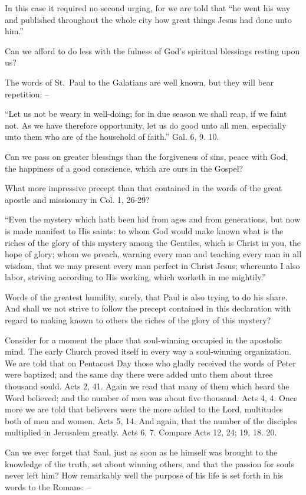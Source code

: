 \documentclass[
]{book}
\begin{document}
In this case it required no second urging, for we are told that ``he went his way and published throughout the whole city how great things Jesus had done unto him.''

Can we afford to do less with the fulness of God's spiritual blessings resting upon us?

The words of St.~Paul to the Galatians are well known, but they will bear repetition: --

``Let us not be weary in well-doing; for in due season we shall reap, if we faint not. As we have therefore opportunity, let us do good unto all men, especially unto them who are of the household of faith.'' Gal. 6, 9. 10.

Can we pass on greater blessings than the forgiveness of sins, peace with God, the happiness of a good conscience, which are ours in the Gospel?

What more impressive precept than that contained in the words of the great apostle and missionary in Col. 1, 26-29?

``Even the mystery which hath been hid from ages and from generations, but now is made manifest to His saints: to whom God would make known what is the riches of the glory of this mystery among the Gentiles, which is Christ in you, the hope of glory; whom we preach, warning every man and teaching every man in all wisdom, that we may present every man perfect in Christ Jesus; whereunto I also labor, striving according to His working, which worketh in me mightily.''

Words of the greatest humility, surely, that Paul is also trying to do his share. And shall we not strive to follow the precept contained in this declaration with regard to making known to others the riches of the glory of this mystery?

Consider for a moment the place that soul-winning occupied in the apostolic mind. The early Church proved itself in every way a soul-winning organization. We are told that on Pentacost Day those who gladly received the words of Peter were baptized; and the same day there were added unto them about three thousand sould. Acts 2, 41. Again we read that many of them which heard the Word believed; and the number of men was about five thousand. Acts 4, 4. Once more we are told that believers were the more added to the Lord, multitudes both of men and women. Acts 5, 14. And again, that the number of the disciples multiplied in Jerusalem greatly. Acts 6, 7. Compare Acts 12, 24; 19, 18. 20.

Can we ever forget that Saul, just as soon as he himself was brought to the knowledge of the truth, set about winning others, and that the passion for souls never left him? How remarkably well the purpose of his life is set forth in his words to the Romans: --
\end{document}
